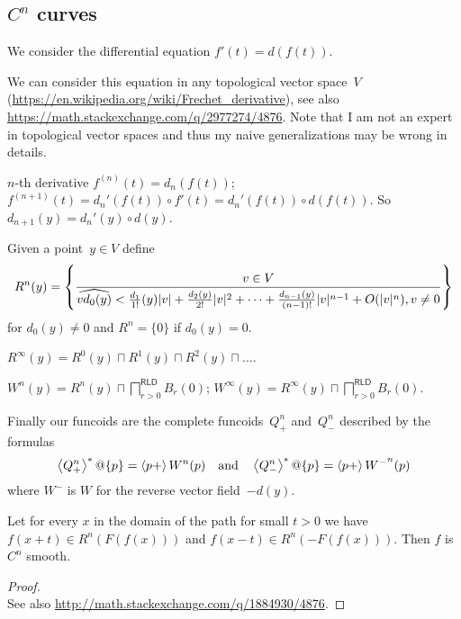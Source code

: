 \subsection{$C^n$ curves}

We consider the differential equation $f'(t) = d(f(t))$.

We can consider this equation in any topological vector
space~$V$ (\url{https://en.wikipedia.org/wiki/Frechet_derivative}), see also
\url{https://math.stackexchange.com/q/2977274/4876}.
Note that I am not an expert in topological vector spaces
and thus my naive generalizations may be wrong in details.

$n$-th derivative $f^{(n)}(t)=d_n(f(t))$;
$f^{(n+1)}(t)=d_n'(f(t))\circ f'(t)=d_n'(f(t))\circ d(f(t))$.
So $d_{n+1}(y)=d_n'(y)\circ d(y)$.

Given a point~$y\in V$
define \[R^n(y) = \left\{ \frac{v\in V}{\widehat{vd_0(y)}<
\frac{d_1}{1!}(y)|v|+\frac{d_2(y)}{2!}|v|^2+\dots+\frac{d_{n-1}(y)}{(n-1)!}|v|^{n-1}+O(|v|^n), v\ne 0}\right\}\] for $d_0(y)\ne 0$ and $R^n = \{0\}$ if $d_0(y)=0$.

\begin{defn}
$R^\infty(y) = R^0(y)\sqcap R^1(y)\sqcap R^2(y)\sqcap\dots$.
\end{defn}


\begin{defn}
$W^n(y) = R^n(y) \sqcap \bigsqcap^{\mathsf{RLD}}_{r>0}B_r(0)$;
$W^\infty(y) = R^\infty(y) \sqcap \bigsqcap^{\mathsf{RLD}}_{r>0}B_r(0)$.
\end{defn}

Finally our funcoids are the complete funcoids~$Q_+^n$ and~$Q_-^n$ described by the formulas
\[
\left\langle Q_+^n\right\rangle ^{\ast}@\{p\} = \left\langle p+\right\rangle W^n(p) \quad\text{and}\quad \left\langle Q_-^n\right\rangle ^{\ast}@\{p\} = \left\langle p+\right\rangle {W^-}^n(p)
\]
where $W^-$ is $W$ for the reverse vector field~$-d(y)$.


\begin{lem}
Let for every $x$ in the domain of the path for small $t > 0$ we have $f (x + t) \in R^n (F (f (x)))$ and $f (x - t) \in R^n (- F (f (x)))$.
Then $f$ is $C^n$ smooth.
\end{lem}

\begin{proof}
\\
See also \url{http://math.stackexchange.com/q/1884930/4876}.
\end{proof}

